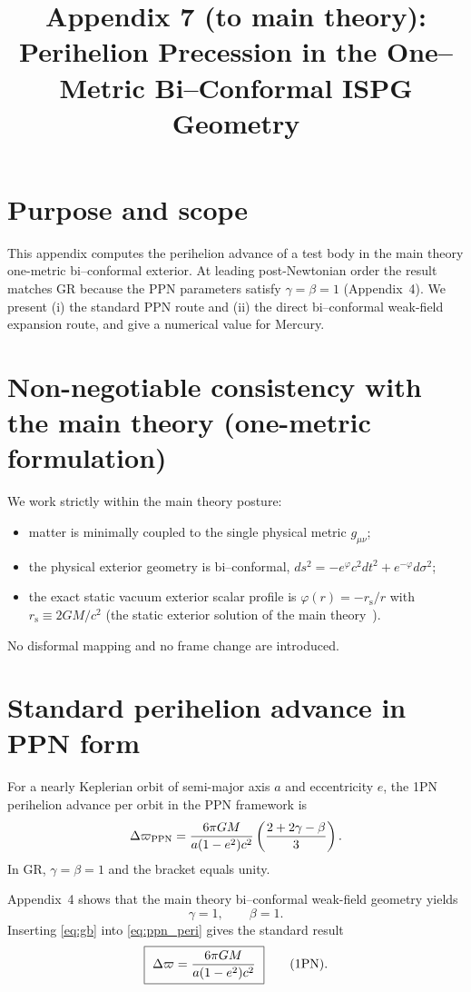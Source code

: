 \documentclass[11pt]{article}
\title{Appendix 7 (to main theory): Perihelion Precession in the One--Metric Bi--Conformal ISPG Geometry}
\author{}
\date{}
\newcommand{\rs}{r_{\mathrm{s}}}
\begin{document}
\let\phi\varphi
\maketitle

\section*{Purpose and scope}
This appendix computes the perihelion advance of a test body in the main theory one-metric bi--conformal exterior. At leading post-Newtonian order the result matches GR because the PPN parameters satisfy $\gamma=\beta=1$ (Appendix~4). We present (i) the standard PPN route and (ii) the direct bi--conformal weak-field expansion route, and give a numerical value for Mercury.

\section*{Non-negotiable consistency with the main theory (one-metric formulation)}
We work strictly within the main theory posture:
\begin{itemize}
\item matter is minimally coupled to the single physical metric $g_{\mu\nu}$;
\item the physical exterior geometry is bi--conformal, $ds^2=-e^{\phi}c^2dt^2+e^{-\phi}d\sigma^2$;
\item the exact static vacuum exterior scalar profile is $\phi(r)=-\rs/r$ with $\rs\equiv 2GM/c^2$ (the static exterior solution of the main theory~\cite{Lotishvili2026}).
\end{itemize}
No disformal mapping and no frame change are introduced.

\section{Standard perihelion advance in PPN form}\label{sec:ppn_app7}
For a nearly Keplerian orbit of semi-major axis $a$ and eccentricity $e$, the 1PN perihelion advance per orbit in the PPN framework is
\begin{equation}
\Delta\varpi_{\rm PPN}
=\frac{6\pi GM}{a(1-e^2)c^2}\left(\frac{2+2\gamma-\beta}{3}\right).
\label{eq:ppn_peri}
\end{equation}
In GR, $\gamma=\beta=1$ and the bracket equals unity.

Appendix~4 shows that the main theory bi--conformal weak-field geometry yields
\begin{equation}
\gamma=1,\qquad \beta=1.
\label{eq:gb}
\end{equation}
Inserting \eqref{eq:gb} into \eqref{eq:ppn_peri} gives the standard result
\begin{equation}
\boxed{\ \Delta\varpi=\frac{6\pi GM}{a(1-e^2)c^2}\ }\qquad (1{\rm PN}).
\label{eq:peri_final}
\end{equation}
\end{document}
